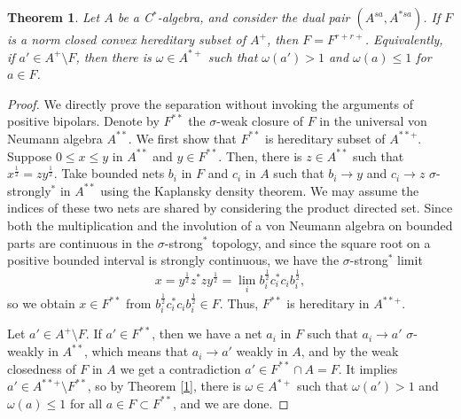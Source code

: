 \documentclass[noamsfonts,a4paper,10pt]{amsart}
\theoremstyle{plain}
\newtheorem{theorem}{Theorem}[section]
\theoremstyle{definition}
\begin{document}
\begin{theorem}
Let $A$ be a C$^*$-algebra, and consider the dual pair $(A^{sa},A^{*sa})$.
If $F$ is a norm closed convex hereditary subset of $A^+$, then $F=F^{r+r+}$.
Equivalently, if $a'\in A^+\setminus F$, then there is $\omega\in A^{*+}$ such that $\omega(a')>1$ and $\omega(a)\le1$ for $a\in F$.
\end{theorem}
\begin{proof}
We directly prove the separation without invoking the arguments of positive bipolars.
Denote by $F^{**}$ the $\sigma$-weak closure of $F$ in the universal von Neumann algebra $A^{**}$.
We first show that $F^{**}$ is hereditary subset of $A^{**+}$.
Suppose $0\le x\le y$ in $A^{**}$ and $y\in F^{**}$.
Then, there is $z\in A^{**}$ such that $x^{\frac12}=zy^{\frac12}$.
Take bounded nets $b_i$ in $F$ and $c_i$ in $A$ such that $b_i\to y$ and $c_i\to z$ $\sigma$-strongly$^*$ in $A^{**}$ using the Kaplansky density theorem.
We may assume the indices of these two nets are shared by considering the product directed set.
Since both the multiplication and the involution of a von Neumann algebra on bounded parts are continuous in the $\sigma$-strong$^*$ topology, and since the square root on a positive bounded interval is strongly continuous, we have the $\sigma$-strong$^*$ limit
\[x=y^{\frac12}z^*zy^{\frac12}=\lim_ib_i^{\frac12}c_i^*c_ib_i^{\frac12},\]
so we obtain $x\in F^{**}$ from $b_i^{\frac12}c_i^*c_ib_i^{\frac12}\in F$.
Thus, $F^{**}$ is hereditary in $A^{**+}$.

Let $a'\in A^+\setminus F$.
If $a'\in F^{**}$, then we have a net $a_i$ in $F$ such that $a_i\to a'$ $\sigma$-weakly in $A^{**}$, which means that $a_i\to a'$ weakly in $A$, and by the weak closedness of $F$ in $A$ we get a contradiction $a'\in F^{**}\cap A=F$.
It implies $a'\in A^{**+}\setminus F^{**}$, so by Theorem \ref{1}, there is $\omega\in A^{*+}$ such that $\omega(a')>1$ and $\omega(a)\le1$ for all $a\in F\subset F^{**}$, and we are done.
\end{proof}
\end{document}
